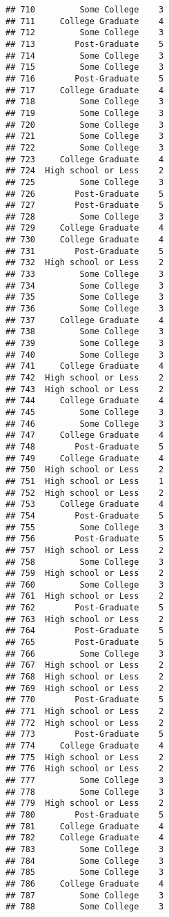 \documentclass[
]{article}
\begin{document}
\begin{verbatim}
## 710         Some College    3
## 711     College Graduate    4
## 712         Some College    3
## 713        Post-Graduate    5
## 714         Some College    3
## 715         Some College    3
## 716        Post-Graduate    5
## 717     College Graduate    4
## 718         Some College    3
## 719         Some College    3
## 720         Some College    3
## 721         Some College    3
## 722         Some College    3
## 723     College Graduate    4
## 724  High school or Less    2
## 725         Some College    3
## 726        Post-Graduate    5
## 727        Post-Graduate    5
## 728         Some College    3
## 729     College Graduate    4
## 730     College Graduate    4
## 731        Post-Graduate    5
## 732  High school or Less    2
## 733         Some College    3
## 734         Some College    3
## 735         Some College    3
## 736         Some College    3
## 737     College Graduate    4
## 738         Some College    3
## 739         Some College    3
## 740         Some College    3
## 741     College Graduate    4
## 742  High school or Less    2
## 743  High school or Less    2
## 744     College Graduate    4
## 745         Some College    3
## 746         Some College    3
## 747     College Graduate    4
## 748        Post-Graduate    5
## 749     College Graduate    4
## 750  High school or Less    2
## 751  High school or Less    1
## 752  High school or Less    2
## 753     College Graduate    4
## 754        Post-Graduate    5
## 755         Some College    3
## 756        Post-Graduate    5
## 757  High school or Less    2
## 758         Some College    3
## 759  High school or Less    2
## 760         Some College    3
## 761  High school or Less    2
## 762        Post-Graduate    5
## 763  High school or Less    2
## 764        Post-Graduate    5
## 765        Post-Graduate    5
## 766         Some College    3
## 767  High school or Less    2
## 768  High school or Less    2
## 769  High school or Less    2
## 770        Post-Graduate    5
## 771  High school or Less    2
## 772  High school or Less    2
## 773        Post-Graduate    5
## 774     College Graduate    4
## 775  High school or Less    2
## 776  High school or Less    2
## 777         Some College    3
## 778         Some College    3
## 779  High school or Less    2
## 780        Post-Graduate    5
## 781     College Graduate    4
## 782     College Graduate    4
## 783         Some College    3
## 784         Some College    3
## 785         Some College    3
## 786     College Graduate    4
## 787         Some College    3
## 788         Some College    3

\end{verbatim}
\end{document}
